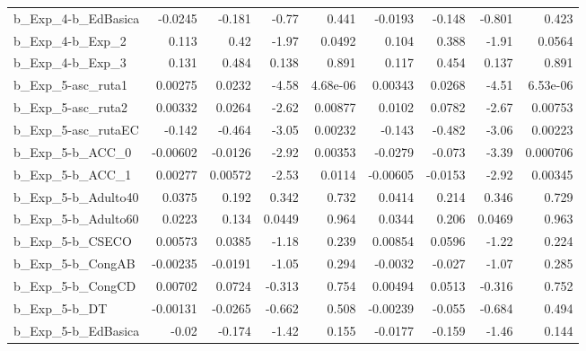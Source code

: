 \begin{tabular}{lrrrrrrrr}
b\_Exp\_4-b\_EdBasica         &     -0.0245 &       -0.181 &     -0.77 &    0.441 &    -0.0193 &      -0.148 &       -0.801 &         0.423 \\
b\_Exp\_4-b\_Exp\_2            &       0.113 &         0.42 &     -1.97 &   0.0492 &      0.104 &       0.388 &        -1.91 &        0.0564 \\
b\_Exp\_4-b\_Exp\_3            &       0.131 &        0.484 &     0.138 &    0.891 &      0.117 &       0.454 &        0.137 &         0.891 \\
b\_Exp\_5-asc\_ruta1          &     0.00275 &       0.0232 &     -4.58 & 4.68e-06 &    0.00343 &      0.0268 &        -4.51 &      6.53e-06 \\
b\_Exp\_5-asc\_ruta2          &     0.00332 &       0.0264 &     -2.62 &  0.00877 &     0.0102 &      0.0782 &        -2.67 &       0.00753 \\
b\_Exp\_5-asc\_rutaEC         &      -0.142 &       -0.464 &     -3.05 &  0.00232 &     -0.143 &      -0.482 &        -3.06 &       0.00223 \\
b\_Exp\_5-b\_ACC\_0            &    -0.00602 &      -0.0126 &     -2.92 &  0.00353 &    -0.0279 &      -0.073 &        -3.39 &      0.000706 \\
b\_Exp\_5-b\_ACC\_1            &     0.00277 &      0.00572 &     -2.53 &   0.0114 &   -0.00605 &     -0.0153 &        -2.92 &       0.00345 \\
b\_Exp\_5-b\_Adulto40         &      0.0375 &        0.192 &     0.342 &    0.732 &     0.0414 &       0.214 &        0.346 &         0.729 \\
b\_Exp\_5-b\_Adulto60         &      0.0223 &        0.134 &    0.0449 &    0.964 &     0.0344 &       0.206 &       0.0469 &         0.963 \\
b\_Exp\_5-b\_CSECO            &     0.00573 &       0.0385 &     -1.18 &    0.239 &    0.00854 &      0.0596 &        -1.22 &         0.224 \\
b\_Exp\_5-b\_CongAB           &    -0.00235 &      -0.0191 &     -1.05 &    0.294 &    -0.0032 &      -0.027 &        -1.07 &         0.285 \\
b\_Exp\_5-b\_CongCD           &     0.00702 &       0.0724 &    -0.313 &    0.754 &    0.00494 &      0.0513 &       -0.316 &         0.752 \\
b\_Exp\_5-b\_DT               &    -0.00131 &      -0.0265 &    -0.662 &    0.508 &   -0.00239 &      -0.055 &       -0.684 &         0.494 \\
b\_Exp\_5-b\_EdBasica         &       -0.02 &       -0.174 &     -1.42 &    0.155 &    -0.0177 &      -0.159 &        -1.46 &         0.144 \\

\end{tabular}
